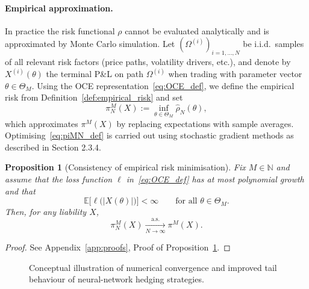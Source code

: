 \documentclass[12pt,a4paper]{article}
\theoremstyle{definition}
\theoremstyle{plain}
\newtheorem{proposition}{Proposition}[section]
\theoremstyle{remark}
\theoremstyle{plain}
\begin{document}
\paragraph{Empirical approximation.}
In practice the risk functional $\rho$ cannot be evaluated analytically and is approximated by Monte Carlo simulation.
Let $(\Omega^{(i)})_{i=1,\dots,N}$ be i.i.d.\ samples of all relevant risk factors (price paths, volatility drivers, etc.), and denote by $X^{(i)}(\theta)$ the terminal P\&L on path $\Omega^{(i)}$ when trading with parameter vector $\theta\in\Theta_M$.
Using the OCE representation~\eqref{eq:OCE_def}, we define the empirical risk from Definition~\ref{def:empirical_risk} and set
\begin{equation}
\pi^{M}_N(X)
:=
\inf_{\theta\in\Theta_M}
\widehat{\rho}_N(\theta),
\label{eq:piMN_def}
\end{equation}
which approximates $\pi^{M}(X)$ by replacing expectations with sample averages.
Optimising~\eqref{eq:piMN_def} is carried out using stochastic gradient methods as described in Section 2.3.4.

\begin{proposition}[Consistency of empirical risk minimisation]
\label{prop:empirical_consistency}
Fix $M\in\mathbb N$ and assume that the loss function $\ell$ in~\eqref{eq:OCE_def} has at most polynomial growth and that
\[
\mathbb{E}\bigl[\ell\bigl(|X(\theta)|\bigr)\bigr] < \infty
\qquad\text{for all }\theta\in\Theta_M.
\]
Then, for any liability $X$,
\[
\pi^{M}_N(X) \xrightarrow[N\to\infty]{\text{a.s.}} \pi^{M}(X).
\]
\end{proposition}

\begin{proof}
See Appendix~\ref{app:proofs}, Proof of Proposition~\ref{prop:empirical_consistency}.
\end{proof}
\FloatBarrier
\begin{figure}[!ht]
\centering
{}
\caption{Conceptual illustration of numerical convergence and improved tail behaviour of neural-network hedging strategies.}
\label{fig:nn_convergence}
\end{figure}
\FloatBarrier
\end{document}
